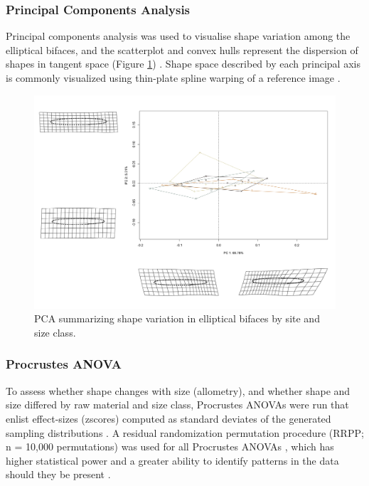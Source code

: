 \documentclass[]{interact}
\theoremstyle{plain}%
\theoremstyle{definition}
\theoremstyle{remark}
\begin{document}
\hypertarget{principal-components-analysis}{%
\subsubsection{Principal Components
Analysis}\label{principal-components-analysis}}

Principal components analysis \citep{RN1746} was used to visualise shape
variation among the elliptical bifaces, and the scatterplot and convex
hulls represent the dispersion of shapes in tangent space (Figure
\ref{fig:pca}) \citep{RN8633,RN5616,RN11143,RN7550}. Shape space
described by each principal axis is commonly visualized using thin-plate
spline warping of a reference image \citep{RN1731,RN479}.

\begin{figure}\centering
\includegraphics[width=\linewidth]{figs/pca.png}
\caption{PCA summarizing shape variation in elliptical bifaces by site and size class. }
\label{fig:pca}
\end{figure}

\hypertarget{procrustes-anova}{%
\subsubsection{Procrustes ANOVA}\label{procrustes-anova}}

To assess whether shape changes with size (allometry), and whether shape
and size differed by raw material and size class, Procrustes ANOVAs
\citep{RN1749} were run that enlist effect-sizes (zscores) computed as
standard deviates of the generated sampling distributions
\citep{RN1756}. A residual randomization permutation procedure (RRPP; n
= 10,000 permutations) was used for all Procrustes ANOVAs
\citep{RN1655,RN11775}, which has higher statistical power and a greater
ability to identify patterns in the data should they be present
\citep{RN1719}.
\end{document}
